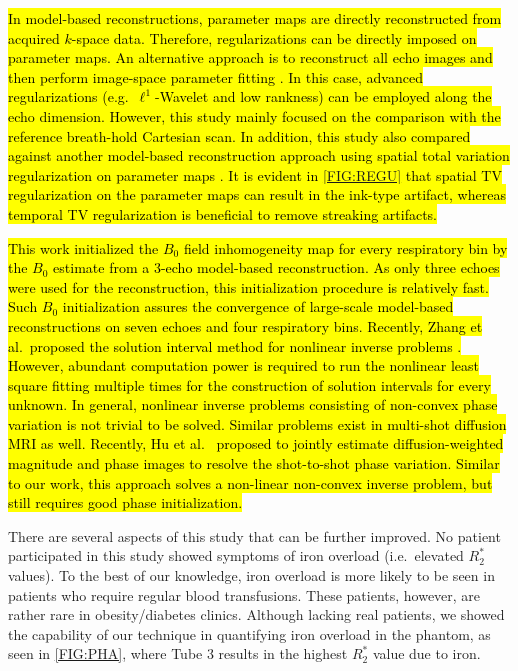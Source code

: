 \documentclass[journal,twoside,web]{ieeecolor}
\begin{document}
\hl{In model-based reconstructions, parameter maps are directly reconstructed 
from acquired $k$-space data. 
Therefore, regularizations can be directly imposed on parameter maps. 
An alternative approach is to reconstruct all echo images 
and then perform image-space parameter fitting 
\mbox{\cite{armstrong_2018_fat,zhong_2020_r2sclinic,zhong_2020_resr2s,wang_2022_mt-me,starekova_2022_fb-fat}}.
In this case, advanced regularizations (e.g.~$\ell^1$-Wavelet and low rankness) 
can be employed along the echo dimension. 
However, this study mainly focused on the comparison 
with the reference breath-hold Cartesian scan. 
In addition, this study also compared against another model-based reconstruction approach 
using spatial total variation regularization on parameter maps \mbox{\cite{schneider_2020_mobawfr2s}}. 
It is evident in \mbox{\cref{FIG:REGU}} that spatial TV regularization on the parameter maps 
can result in the ink-type artifact, whereas temporal TV regularization is beneficial to remove %
streaking artifacts.
}


\hl{This work initialized the $B_0$ field inhomogeneity map for every respiratory bin 
by the $B_0$ estimate from a 3-echo model-based reconstruction. 
As only three echoes were used for the reconstruction, 
this initialization procedure is relatively fast. 
Such $B_0$ initialization assures the convergence of large-scale model-based reconstructions 
on seven echoes and four respiratory bins. 
Recently, Zhang et al.~proposed the solution interval method for nonlinear inverse problems 
\mbox{\cite{zhang_2021_nlls_init}}. 
However, abundant computation power is required to 
run the nonlinear least square fitting multiple times 
for the construction of solution intervals for every unknown.
In general, nonlinear inverse problems consisting of non-convex phase variation 
is not trivial to be solved. 
Similar problems exist in multi-shot diffusion MRI as well. 
Recently, Hu et al.~\mbox{\cite{hu_2020_spa_llr}} proposed to 
jointly estimate diffusion-weighted magnitude and phase images 
to resolve the shot-to-shot phase variation. 
Similar to our work, this approach solves a non-linear non-convex inverse problem, 
but still requires good phase initialization.}

There are several aspects of this study that can be further improved. 
No patient participated in this study 
showed symptoms of iron overload (i.e.~elevated $R_2^*$ values). 
To the best of our knowledge, iron overload is more likely to be seen 
in patients who require regular blood transfusions. 
These patients, however, are rather rare in obesity/diabetes clinics. 
Although lacking real patients, we showed the capability of our technique in 
quantifying iron overload in the phantom, as seen in \cref{FIG:PHA}, 
where Tube 3 results in the highest $R_2^*$ value due to iron. 
\end{document}

